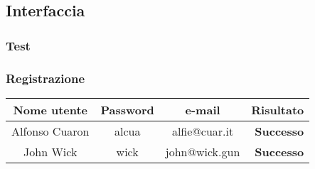 \documentclass[12pt, a4paper]{article}
\begin{document}
\subsection{Interfaccia}
\subsubsection{Test}
\subsubsection{Registrazione}
\begin{center}
\begin{tabular}{|c|c|c|r|}
\hline
\textbf{Nome utente} & \textbf{Password} & \textbf{e-mail} & \textbf{Risultato} \\
\hline
Alfonso Cuaron & alcua & alfie@cuar.it & \textbf{Successo} \\
John Wick & wick & john@wick.gun & \textbf{Successo} \\
\hline
\end{tabular}
\end{center}
\end{document}
